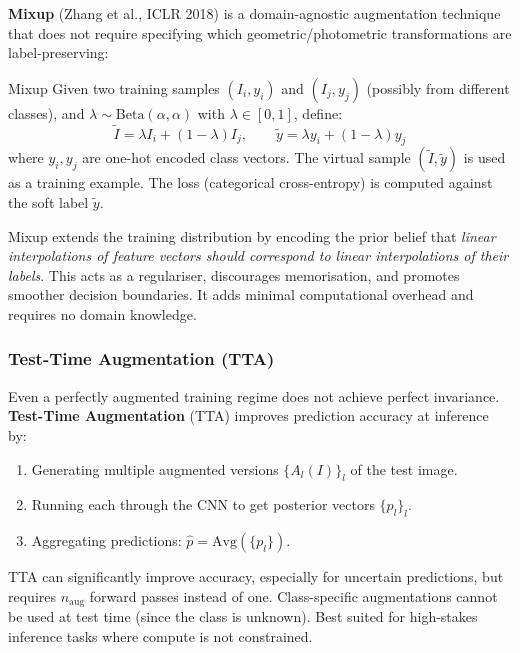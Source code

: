 \documentclass[11pt,a4paper]{article}
\newcommand{\term}[1]{\textcolor{DefGreen}{\textbf{#1}}\index{#1}}
\begin{document}
\term{Mixup} (Zhang et al., ICLR 2018) is a domain-agnostic augmentation technique that does not require specifying which geometric/photometric transformations are label-preserving:

\begin{defbox}{Mixup}
Given two training samples $(I_i, y_i)$ and $(I_j, y_j)$ (possibly from different classes), and $\lambda \sim \mathrm{Beta}(\alpha, \alpha)$ with $\lambda \in [0,1]$, define:
\[
\tilde{I} = \lambda I_i + (1-\lambda) I_j, \qquad \tilde{y} = \lambda y_i + (1-\lambda) y_j
\]
where $y_i, y_j$ are one-hot encoded class vectors. The virtual sample $(\tilde{I}, \tilde{y})$ is used as a training example. The loss (categorical cross-entropy) is computed against the soft label $\tilde{y}$.
\end{defbox}

\begin{insightbox}
Mixup extends the training distribution by encoding the prior belief that \emph{linear interpolations of feature vectors should correspond to linear interpolations of their labels}. This acts as a regulariser, discourages memorisation, and promotes smoother decision boundaries. It adds minimal computational overhead and requires no domain knowledge.
\end{insightbox}

\subsubsection{Test-Time Augmentation (TTA)}

Even a perfectly augmented training regime does not achieve perfect invariance. \term{Test-Time Augmentation} (TTA) improves prediction accuracy at inference by:
\begin{enumerate}
  \item Generating multiple augmented versions $\{A_l(I)\}_l$ of the test image.
  \item Running each through the CNN to get posterior vectors $\{p_l\}_l$.
  \item Aggregating predictions: $\hat{p} = \mathrm{Avg}(\{p_l\})$.
\end{enumerate}

\begin{notebox}
TTA can significantly improve accuracy, especially for uncertain predictions, but requires $n_{\text{aug}}$ forward passes instead of one. Class-specific augmentations cannot be used at test time (since the class is unknown). Best suited for high-stakes inference tasks where compute is not constrained.
\end{notebox}
\end{document}
